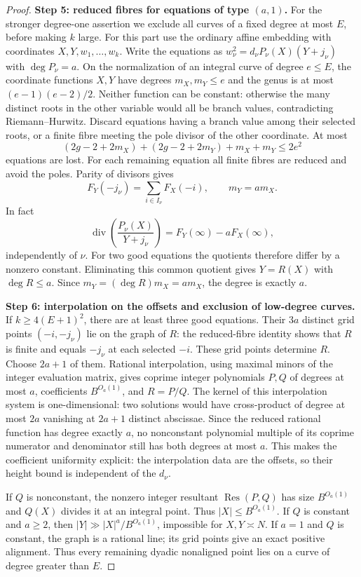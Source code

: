 \begin{proof}
\medskip\noindent
\textbf{Step 5: reduced fibres for equations of type $(a,1)$.}
For the stronger degree-one assertion we exclude all curves of a fixed
degree at most $E$, before making $k$ large.  For this part use the
ordinary affine embedding with coordinates $X,Y,w_1,\ldots,w_k$.
Write the equations as
$w_\nu^2=d_\nu P_\nu(X)(Y+j_\nu)$ with $\deg P_\nu=a$.
On the normalization of an integral curve of degree $e\leq E$,
the coordinate functions $X,Y$ have degrees $m_X,m_Y\leq e$ and the
genus is at most $(e-1)(e-2)/2$.  Neither function can be constant:
otherwise the many distinct roots in the other variable would all be
branch values, contradicting Riemann--Hurwitz.
Discard equations having a branch value among their selected roots, or a
finite fibre meeting the pole divisor of the other coordinate.
At most
\[
 (2g-2+2m_X)+(2g-2+2m_Y)+m_X+m_Y\leq2e^2
\]
equations are lost.  For each remaining equation all finite fibres are
reduced and avoid the poles.  Parity of divisors gives
\[
 F_Y(-j_\nu)=\sum_{i\in I_\nu}F_X(-i),\qquad m_Y=am_X.
\]
In fact
\[
 \operatorname{div}\!\left(\frac{P_\nu(X)}{Y+j_\nu}\right)
       =F_Y(\infty)-aF_X(\infty),
\]
independently of $\nu$.  For two good equations the quotients therefore
differ by a nonzero constant.  Eliminating this common quotient gives
$Y=R(X)$ with $\deg R\leq a$.  Since
$m_Y=(\deg R)m_X=am_X$, the degree is exactly $a$.

\medskip\noindent
\textbf{Step 6: interpolation on the offsets and exclusion of low-degree curves.}  If
$k\geq4(E+1)^2$, there are at least three good equations.
Their $3a$ distinct grid points $(-i,-j_\nu)$ lie on the graph of $R$:
the reduced-fibre identity shows that $R$ is finite and equals $-j_\nu$
at each selected $-i$.  These grid points determine $R$.
Choose $2a+1$ of them.  Rational interpolation, using maximal minors of
the integer evaluation matrix, gives coprime integer polynomials
$P,Q$ of degrees at most $a$, coefficients $B^{O_a(1)}$, and $R=P/Q$.
The kernel of this interpolation system is one-dimensional: two solutions
would have cross-product of degree at most $2a$ vanishing at $2a+1$
distinct abscissae.  Since the reduced rational function has degree exactly
$a$, no nonconstant polynomial multiple of its coprime numerator and
denominator still has both degrees at most $a$.
This makes the coefficient uniformity explicit: the interpolation data
are the offsets, so their height bound is independent of the $d_\nu$.

If $Q$ is nonconstant, the nonzero integer resultant
$\operatorname{Res}(P,Q)$ has size $B^{O_a(1)}$ and $Q(X)$ divides it
at an integral point.  Thus $|X|\leq B^{O_a(1)}$.  If $Q$ is constant
and $a\geq2$, then $|Y|\gg |X|^a/B^{O_a(1)}$, impossible for
$X,Y\asymp N$.  If $a=1$ and $Q$ is constant, the graph is a rational
line; its grid points give an exact positive alignment.  Thus every
remaining dyadic nonaligned point lies on a curve of degree greater than
$E$.


\end{proof}
